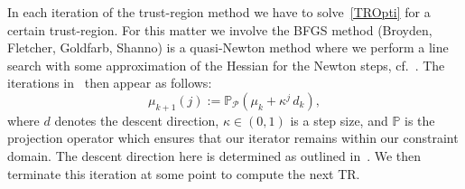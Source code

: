 In each iteration of the trust-region method we have to solve~\eqref{TROpti} for a certain trust-region.
For this matter we involve the BFGS method (Broyden, Fletcher, Goldfarb, Shanno) is a quasi-Newton method where we perform a line search with some approximation of the Hessian for the Newton steps, cf.~\cite[Chapter 4]{Kelley1999}.
The iterations in~\cite{Keil2021} then appear as follows:
\begin{equation*}\label{BFGSStep}
    \mu_{k+1}(j) := \mathbb{P}_{\mathcal{P}} \left( \mu_k + \kappa^j \, d_k \right),
\end{equation*}
where $d$ denotes the descent direction, $\kappa \in (0, 1)$ is a step size, and $\mathbb{P}$ is the projection operator which ensures that our iterator remains within our constraint domain.
The descent direction here is determined as outlined in~\cite[Section 5.5.3]{Kelley1999}.
We then terminate this iteration at some point to compute the next TR.\@